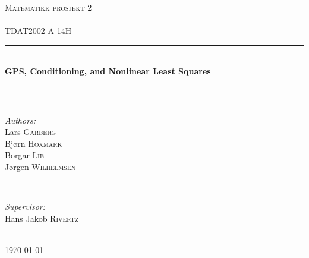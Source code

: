 

\begin{titlepage}

\newcommand{\HRule}{\rule{\linewidth}{0.5mm}} 

\center 

\textsc{\LARGE Matematikk prosjekt 2}\\[1.5cm] %
\textsc{\Large }\\[0.5cm] %
\textsc{\large TDAT2002-A 14H}\\[0.5cm] %

\HRule \\[0.4cm]
{ \huge \bfseries GPS, Conditioning, and Nonlinear Least Squares}\\[0.4cm] 
\HRule \\[1.5cm]


\begin{minipage}{0.4\textwidth}
\begin{flushleft} \large
\emph{Authors:}\\
Lars \textsc{Garberg} \\
Bjørn \textsc{Hoxmark} \\
Borgar \textsc{Lie} \\
Jørgen \textsc{Wilhelmsen}

\end{flushleft}
\end{minipage}
~
\begin{minipage}{0.4\textwidth}
\begin{flushright} \large
\emph{Supervisor:} \\
 Hans Jakob \textsc{Rivertz} %
\end{flushright}
\end{minipage}\\[4cm]



{\large \today}\\[3cm] %


 

\vfill %

\end{titlepage}

